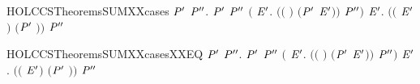 \begin{SaveVerbatim}{HOLCCSTheoremsSUMXXcases}
\HOLTokenTurnstile{} \HOLSymConst{\HOLTokenForall{}} \ensuremath{\HOLBoundVar{P}\sp{\prime}}  \ensuremath{\HOLBoundVar{P}\sp{\prime\prime}}.
        \HOLSymConst{\ensuremath{+}} \ensuremath{\HOLBoundVar{P}\sp{\prime}} \HOLTokenTransBegin{}\HOLTokenTransEnd \ensuremath{\HOLBoundVar{P}\sp{\prime\prime}} \HOLSymConst{\HOLTokenImp{}}
       \ensuremath{(}\HOLSymConst{\HOLTokenExists{}} \ensuremath{\HOLBoundVar{E}\sp{\prime}}. \ensuremath{(}\ensuremath{(} \HOLSymConst{\ensuremath{=}} \ensuremath{)} \HOLSymConst{\HOLTokenConj{}} \ensuremath{(}\ensuremath{\HOLBoundVar{P}\sp{\prime}} \HOLSymConst{\ensuremath{=}} \ensuremath{\HOLBoundVar{E}\sp{\prime}}\ensuremath{)}\ensuremath{)} \HOLSymConst{\HOLTokenConj{}}  \HOLTokenTransBegin{}\HOLTokenTransEnd \ensuremath{\HOLBoundVar{P}\sp{\prime\prime}}\ensuremath{)} \HOLSymConst{\HOLTokenDisj{}}
       \HOLSymConst{\HOLTokenExists{}} \ensuremath{\HOLBoundVar{E}\sp{\prime}}. \ensuremath{(}\ensuremath{(} \HOLSymConst{\ensuremath{=}} \ensuremath{\HOLBoundVar{E}\sp{\prime}}\ensuremath{)} \HOLSymConst{\HOLTokenConj{}} \ensuremath{(}\ensuremath{\HOLBoundVar{P}\sp{\prime}} \HOLSymConst{\ensuremath{=}} \ensuremath{)}\ensuremath{)} \HOLSymConst{\HOLTokenConj{}}  \HOLTokenTransBegin{}\HOLTokenTransEnd \ensuremath{\HOLBoundVar{P}\sp{\prime\prime}}
\end{SaveVerbatim}
\newcommand{\HOLCCSTheoremsSUMXXcases}{\UseVerbatim{HOLCCSTheoremsSUMXXcases}}
\begin{SaveVerbatim}{HOLCCSTheoremsSUMXXcasesXXEQ}
\HOLTokenTurnstile{} \HOLSymConst{\HOLTokenForall{}} \ensuremath{\HOLBoundVar{P}\sp{\prime}}  \ensuremath{\HOLBoundVar{P}\sp{\prime\prime}}.
        \HOLSymConst{\ensuremath{+}} \ensuremath{\HOLBoundVar{P}\sp{\prime}} \HOLTokenTransBegin{}\HOLTokenTransEnd \ensuremath{\HOLBoundVar{P}\sp{\prime\prime}} \HOLSymConst{\HOLTokenEquiv{}}
       \ensuremath{(}\HOLSymConst{\HOLTokenExists{}} \ensuremath{\HOLBoundVar{E}\sp{\prime}}. \ensuremath{(}\ensuremath{(} \HOLSymConst{\ensuremath{=}} \ensuremath{)} \HOLSymConst{\HOLTokenConj{}} \ensuremath{(}\ensuremath{\HOLBoundVar{P}\sp{\prime}} \HOLSymConst{\ensuremath{=}} \ensuremath{\HOLBoundVar{E}\sp{\prime}}\ensuremath{)}\ensuremath{)} \HOLSymConst{\HOLTokenConj{}}  \HOLTokenTransBegin{}\HOLTokenTransEnd \ensuremath{\HOLBoundVar{P}\sp{\prime\prime}}\ensuremath{)} \HOLSymConst{\HOLTokenDisj{}}
       \HOLSymConst{\HOLTokenExists{}} \ensuremath{\HOLBoundVar{E}\sp{\prime}}. \ensuremath{(}\ensuremath{(} \HOLSymConst{\ensuremath{=}} \ensuremath{\HOLBoundVar{E}\sp{\prime}}\ensuremath{)} \HOLSymConst{\HOLTokenConj{}} \ensuremath{(}\ensuremath{\HOLBoundVar{P}\sp{\prime}} \HOLSymConst{\ensuremath{=}} \ensuremath{)}\ensuremath{)} \HOLSymConst{\HOLTokenConj{}}  \HOLTokenTransBegin{}\HOLTokenTransEnd \ensuremath{\HOLBoundVar{P}\sp{\prime\prime}}
\end{SaveVerbatim}
